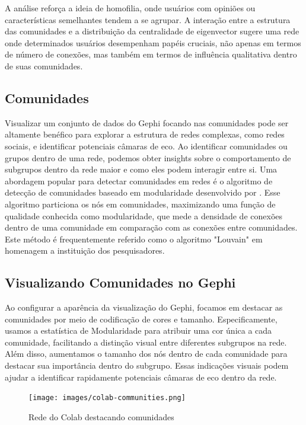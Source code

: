A análise reforça a ideia de homofilia, onde usuários com opiniões ou características semelhantes tendem a se agrupar. A interação entre a estrutura das comunidades e a distribuição da centralidade de eigenvector sugere uma rede onde determinados usuários desempenham papéis cruciais, não apenas em termos de número de conexões, mas também em termos de influência qualitativa dentro de suas comunidades.

\subsection{Comunidades}

Visualizar um conjunto de dados do Gephi focando nas comunidades pode ser altamente benéfico para explorar a estrutura de redes complexas, como redes sociais, e identificar potenciais câmaras de eco. Ao identificar comunidades ou grupos dentro de uma rede, podemos obter insights sobre o comportamento de subgrupos dentro da rede maior e como eles podem interagir entre si. Uma abordagem popular para detectar comunidades em redes é o algoritmo de detecção de comunidades baseado em modularidade desenvolvido por . Esse algoritmo particiona os nós em comunidades, maximizando uma função de qualidade conhecida como modularidade, que mede a densidade de conexões dentro de uma comunidade em comparação com as conexões entre comunidades. Este método é frequentemente referido como o algoritmo "Louvain" em homenagem a instituição dos pesquisadores.

\subsection{Visualizando Comunidades no Gephi}

Ao configurar a aparência da visualização do Gephi, focamos em destacar as comunidades por meio de codificação de cores e tamanho. Especificamente, usamos a estatística de Modularidade para atribuir uma cor única a cada comunidade, facilitando a distinção visual entre diferentes subgrupos na rede. Além disso, aumentamos o tamanho dos nós dentro de cada comunidade para destacar sua importância dentro do subgrupo. Essas indicações visuais podem ajudar a identificar rapidamente potenciais câmaras de eco dentro da rede.

\begin{figure}[!hbtp]
	\caption{Rede do Colab destacando comunidades}
	\label{fig:colab_communities}
	\centering
	\texttt{[image: images/colab-communities.png]}
	\fautor
\end{figure}

